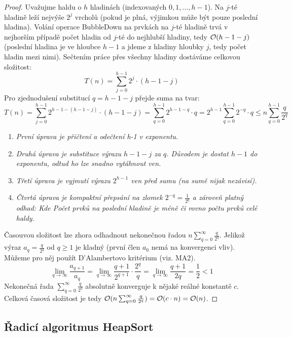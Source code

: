 \begin{proof}
Uvažujme haldu o $h$ hladinách (indexovaných $0, 1, \dots, h-1$). Na $j$-té hladině leží nejvýše $2^j$ vrcholů (pokud je plná, výjimkou může být pouze poslední hladina). Volání operace BubbleDown na prvkách na $j$-té hladině trvá v nejhorším případě počet hladin od $j$-té do nejhlubší hladiny, tedy $\mathcal{O}(h - 1 - j)$ (poslední hladina je ve hloubce $h-1$ a jdeme z hladiny hloubky $j$, tedy počet hladin mezi nimi).
Sečtením práce přes všechny hladiny dostáváme celkovou složitost:
$$T(n) = \sum_{j=0}^{h-1} 2^j \cdot (h - 1 - j)$$
Pro zjednodušení substitucí $q = h - 1 - j$ přejde suma na tvar:
$$T(n) = \sum_{j=0}^{h-1} 2^{h - 1 - (h - 1 - j)} \cdot (h - 1 - j) = \sum_{q=0}^{h-1} 2^{h - 1 - q} \cdot q = 2^{h-1} \sum_{q=0}^{h-1} 2^{-q} \cdot q \leq n \sum_{q=0}^{h-1} \frac{q}{2^q}$$
\begin{enumerate}
    \item \textit{První úprava je přičtení a odečtení h-1 v exponentu.}
    \item \textit{Druhá úprava je substituce výrazu $h-1-j$ za $q$. Důvodem je dostat $h - 1$ do exponentu, odtud ho lze snadno vytáhnout ven.}
    \item \textit{Třetí úprava je vyjmutí výrazu $2^{h-1}$ ven před sumu (na sumě nijak nezávisí).}
    \item \textit{Čtvrtá úprava je kompaktní přepsání na zlomek $2^{-q} = \frac{1}{2^q}$ a zároveň platný odhad: Kde Počet prvků na poslední hladině je méně či rovno počtu prvků celé haldy.} \\
\end{enumerate}
Časouvou složitost lze zhora odhadnout nekonečnou řadou $n \sum_{q=0}^{\infty} \frac{q}{2^q}$. Jelikož výraz $a_q = \frac{q}{2^q}$ od $q \geq 1$ je kladný (první člen $a_0$ nemá na konvergenci vliv). Můžeme pro něj použít D'Alambertovo kritérium (viz. MA2).
$$\lim_{q \to \infty} \frac{a_{q+1}}{a_q} = \lim_{q \to \infty} \frac{q+1}{2^{q+1}} \cdot \frac{2^q}{q} = \lim_{q \to \infty} \frac{q+1}{2q} = \frac{1}{2} < 1$$
Nekonečná řada $\sum_{q=0}^{\infty} \frac{q}{2^q}$ absolutně konverguje k nějaké reálné konstantě $c$.
Celková časová složitost je tedy $\mathcal{O}(n \sum_{q=0}^{\infty} \frac{q}{2^q}) = \mathcal{O}(c \cdot n) = \mathcal{O}(n)$.
\end{proof}

\bigskip

\subsection{Řadicí algoritmus HeapSort}

